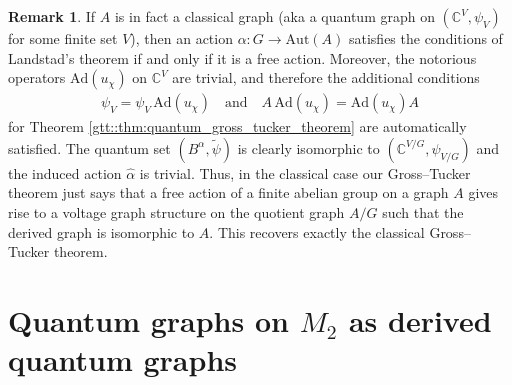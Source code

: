 \documentclass{amsart}
\newcommand{\C}{\mathbb{C}}
\theoremstyle{definition}
\newtheorem{remark}[thm]{Remark}
\theoremstyle{definition}
\begin{document}
\begin{remark}
    If $A$ is in fact a classical graph (aka a quantum graph on $(\C^V, \psi_V)$ for some finite set $V$), then an action $\alpha: G \to \mathrm{Aut}(A)$ satisfies the conditions of Landstad's theorem if and only if it is a free action. Moreover, the notorious operators $\mathrm{Ad}(u_\chi)$ on $\C^V$ are trivial, and therefore the additional conditions
    \begin{align*}
        \psi_V = \psi_V \, \mathrm{Ad}(u_\chi) 
        \quad \text{and} \quad
        A \, \mathrm{Ad}(u_\chi) = \mathrm{Ad}(u_\chi) A
    \end{align*}
    for Theorem \ref{gtt::thm:quantum_gross_tucker_theorem} are automatically satisfied. The quantum set $(B^\alpha, \tilde{\psi})$ is clearly isomorphic to $(\C^{V/G}, \psi_{V/G})$ and the induced action $\hat{\alpha}$ is trivial. Thus, in the classical case our Gross--Tucker theorem just says that a free action of a finite abelian group on a graph $A$ gives rise to a voltage graph structure on the quotient graph $A/G$ such that the derived graph is isomorphic to $A$. This recovers exactly the classical Gross--Tucker theorem.
\end{remark}

\section{Quantum graphs on \texorpdfstring{$M_2$}{M2} as derived quantum graphs}
\label{sec::examples}
\end{document}

